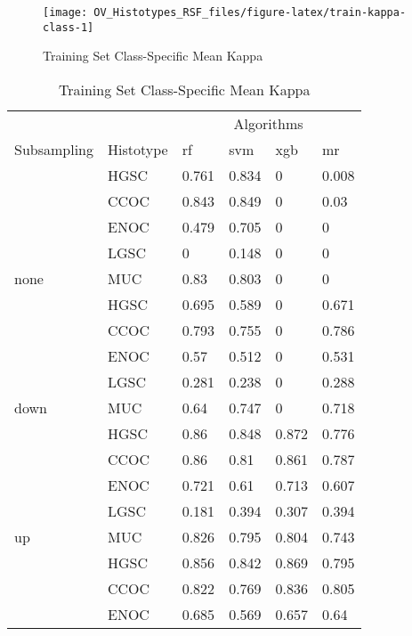 \documentclass[
]{report}
\begin{document}
\begin{figure}[H]

{\centering \texttt{[image: OV\_Histotypes\_RSF\_files/figure-latex/train-kappa-class-1]} 

}

\caption{Training Set Class-Specific Mean Kappa}\label{fig:train-kappa-class}
\end{figure}

\begin{table}

\caption{\label{tab:train-kappa-class-table}Training Set Class-Specific Mean Kappa}
\centering
\begin{tabular}[t]{l|l|l|l|l|l}
\hline
\multicolumn{2}{c|}{ } & \multicolumn{4}{c}{Algorithms} \\
\cline{3-6}
Subsampling & Histotype & rf & svm & xgb & mr\\
\hline
 & HGSC & 0.761 & 0.834 & 0 & 0.008\\
\cline{2-6}
 & CCOC & 0.843 & 0.849 & 0 & 0.03\\
\cline{2-6}
 & ENOC & 0.479 & 0.705 & 0 & 0\\
\cline{2-6}
 & LGSC & 0 & 0.148 & 0 & 0\\
\cline{2-6}
\multirow{-5}{*}{\raggedright\arraybackslash none} & MUC & 0.83 & 0.803 & 0 & 0\\
\cline{1-6}
 & HGSC & 0.695 & 0.589 & 0 & 0.671\\
\cline{2-6}
 & CCOC & 0.793 & 0.755 & 0 & 0.786\\
\cline{2-6}
 & ENOC & 0.57 & 0.512 & 0 & 0.531\\
\cline{2-6}
 & LGSC & 0.281 & 0.238 & 0 & 0.288\\
\cline{2-6}
\multirow{-5}{*}{\raggedright\arraybackslash down} & MUC & 0.64 & 0.747 & 0 & 0.718\\
\cline{1-6}
 & HGSC & 0.86 & 0.848 & 0.872 & 0.776\\
\cline{2-6}
 & CCOC & 0.86 & 0.81 & 0.861 & 0.787\\
\cline{2-6}
 & ENOC & 0.721 & 0.61 & 0.713 & 0.607\\
\cline{2-6}
 & LGSC & 0.181 & 0.394 & 0.307 & 0.394\\
\cline{2-6}
\multirow{-5}{*}{\raggedright\arraybackslash up} & MUC & 0.826 & 0.795 & 0.804 & 0.743\\
\cline{1-6}
 & HGSC & 0.856 & 0.842 & 0.869 & 0.795\\
\cline{2-6}
 & CCOC & 0.822 & 0.769 & 0.836 & 0.805\\
\cline{2-6}
 & ENOC & 0.685 & 0.569 & 0.657 & 0.64\\

\end{tabular}
\end{table}
\end{document}

